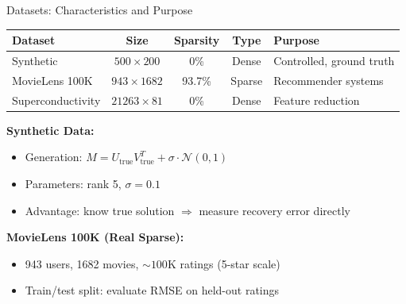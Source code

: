 \documentclass[aspectratio=169,usenames,dvipsnames]{beamer}
\begin{document}
\begin{frame}{Datasets: Characteristics and Purpose}
    
    \begin{table}[h]
    \centering
    \renewcommand{\arraystretch}{1.3}
    \small
    \begin{tabular}{|l|c|c|c|l|}
    \hline
    \textbf{Dataset} & \textbf{Size} & \textbf{Sparsity} & \textbf{Type} & \textbf{Purpose} \\
    \hline
    Synthetic & $500 \times 200$ & 0\% & Dense & Controlled, ground truth \\
    \hline
    MovieLens 100K & $943 \times 1682$ & 93.7\% & Sparse & Recommender systems \\
    \hline
    Superconductivity & $21263 \times 81$ & 0\% & Dense & Feature reduction \\
    \hline
    \end{tabular}
    \end{table}
    
    \vspace{0.4cm}
    
    \textbf{Synthetic Data:}
    \begin{itemize}
        \item Generation: $M = U_{\text{true}} V_{\text{true}}^T + \sigma \cdot \mathcal{N}(0,1)$
        \item Parameters: rank 5, $\sigma = 0.1$
        \item Advantage: know true solution $\Rightarrow$ measure recovery error directly
    \end{itemize}
    
    \vspace{0.2cm}
    
    \textbf{MovieLens 100K (Real Sparse):}
    \begin{itemize}
        \item 943 users, 1682 movies, $\sim 100$K ratings (5-star scale)
        \item Train/test split: evaluate RMSE on held-out ratings
    \end{itemize}
\end{frame}
\end{document}
